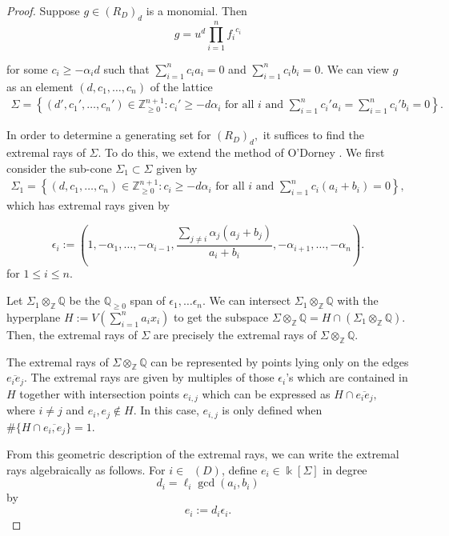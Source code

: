 \documentclass{amsart}
\theoremstyle{plain}
\theoremstyle{definition}
\theoremstyle{remark}
\numberwithin{equation}{section}
\newcommand\bq{{\mathbb Q}}
\newcommand\bz{{\mathbb Z}}
\newcommand\bk{{\Bbbk}}
\newcommand\bida{a}
\newcommand\bidb{b}
\DeclareMathOperator{\Te}{T_=}
\begin{document}
\begin{proof}
Suppose $g
\in (R_D)_d$ is a monomial.
 Then 
\[
	g = u^d \prod_{i = 1}^n {f_i}^{c_i}
\]

\noindent
for some $c_i \ge - \alpha_i d$ such that $\sum_{i=1}^n c_i \bida_i = 0$
and $\sum_{i=1}^n c_i \bidb_i = 0$. We can view $g$ as an element $(d, c_1, \ldots, c_n)$ of the
lattice 
\begin{align*}
	\Sigma = \left\{ (d', c_1', \ldots, c_n') \in \bz_{\geq 0}^{n+1} \colon c_i' \ge - d
\alpha_i \text{ for all }i \text{ and }\sum_{i=1}^n c_i' \bida_i = \sum_{i =
1}^n c_i' \bidb_i = 0 \right \}.	
\end{align*}

In order to determine a generating
set for $(R_D)_d,$ it suffices to find the extremal rays of $\Sigma.$
To do this, we extend the method of O'Dorney \cite[Theorem 8]{dorney:canonical}. 
We first consider the sub-cone $\Sigma_1 \subset \Sigma$
given by
\begin{align*}
	\Sigma_1 = \left\{ (d, c_1, \ldots, c_n) \in \bz_{\geq 0}^{n+1} \colon c_i \ge -
d \alpha_i \text{ for all }i \text{ and }\sum_{i=1}^n c_i (\bida_i+\bidb_i) = 0
\right\},
\end{align*}
which
has extremal rays given by
 
\[
	\epsilon_i := \left(1, -\alpha_1, \ldots, -\alpha_{i-1}, \frac{\sum_{j \ne i}
	\alpha_j (\bida_j + \bidb_j)}{\bida_i + \bidb_i}, -\alpha_{i + 1},
	\ldots, -\alpha_n \right).
\]
for $1 \leq i \leq n$.

Let $\Sigma_1 \otimes_\bz \bq$ be the $\bq_{\ge 0}$ span of $\epsilon_1, \ldots \epsilon_n$.
We can intersect $\Sigma_1 \otimes_\bz \bq$ with the hyperplane $H :=
V(\sum_{i=1}^n \bida_i x_i)$  to get the subspace $\Sigma \otimes_\bz \bq = H \cap (\Sigma_1
\otimes_\bz \bq)$.  Then, the extremal rays of $\Sigma$ are precisely the extremal 
rays of $\Sigma \otimes_\bz \bq$.

The extremal rays of $\Sigma \otimes_\bz \bq$ can be represented by points
lying only on the edges 
$\overline{e_i e_j}$.
The extremal rays are given by multiples of those $\epsilon_i$'s
which are contained in $H$ together with intersection points $e_{i, j}$ which
can be expressed as $H \cap \overline{e_i e_j},$ where $i \neq j$ and $e_i,
e_j \notin H$. In this case, $e_{i,j}$ is only defined when
$\# \{H \cap \overline{e_i, e_j}\} = 1$.


From this geometric description of the extremal rays, we can write
the extremal rays algebraically as follows.
For $i \in \Te(D)$, define $e_i \in \bk[\Sigma]$ in degree 
\[
	d_i = \ell_i \gcd(a_i, b_i)
\]
by 
\[
	e_i := d_i \epsilon_i.
\]


\end{proof}
\end{document}
